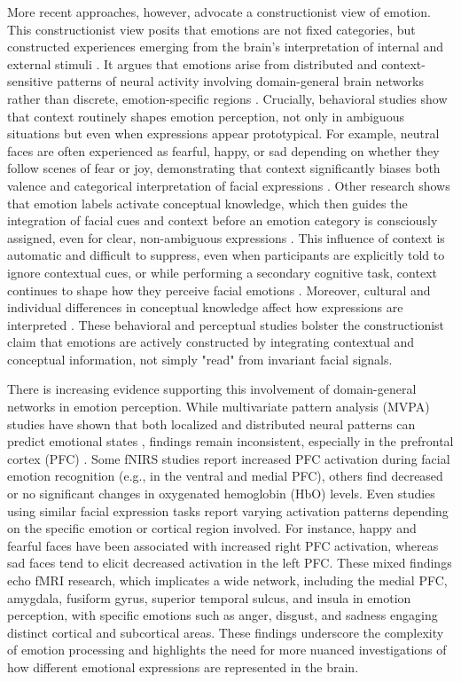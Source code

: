 More recent approaches, however, advocate a constructionist view of emotion. 
This constructionist view posits that emotions are not fixed categories, but constructed experiences emerging from the brain's interpretation of internal and external stimuli \citep{barrett_solving_2006}. 
It argues that emotions arise from distributed and context-sensitive patterns of neural activity involving domain-general brain networks rather than discrete, emotion-specific regions \citep{lindquist_brain_2012}.
Crucially, behavioral studies show that context routinely shapes emotion perception, not only in ambiguous situations but even when expressions appear prototypical. 
For example, neutral faces are often experienced as fearful, happy, or sad depending on whether they follow scenes of fear or joy, demonstrating that context significantly biases both valence and categorical interpretation of facial expressions \citep{calbi_how_2017}. 
Other research shows that emotion labels activate conceptual knowledge, which then guides the integration of facial cues and context before an emotion category is consciously assigned, even for clear, non-ambiguous expressions \citep{brooks_conceptual_2018}.
This influence of context is automatic and difficult to suppress, even when participants are explicitly told to ignore contextual cues, or while performing a secondary cognitive task, context continues to shape how they perceive facial emotions \citep{aviezer_automaticity_2011}. 
Moreover, cultural and individual differences in conceptual knowledge affect how expressions are interpreted \citep{lee_context_2012}. 
These behavioral and perceptual studies bolster the constructionist claim that emotions are actively constructed by integrating contextual and conceptual information, not simply "read" from invariant facial signals. 

There is increasing evidence supporting this involvement of domain-general networks in emotion perception. 
While multivariate pattern analysis (MVPA) studies have shown that both localized and distributed neural patterns can predict emotional states \citep{kragel_decoding_2016}, findings remain inconsistent, especially in the prefrontal cortex (PFC) \citep{westgarth_systematic_2021, bendall_brief_2016}.
Some fNIRS studies report increased PFC activation during facial emotion recognition (e.g., in the ventral and medial PFC), others find decreased or no significant changes in oxygenated hemoglobin (HbO) levels.
Even studies using similar facial expression tasks report varying activation patterns depending on the specific emotion or cortical region involved. 
For instance, happy and fearful faces have been associated with increased right PFC activation, whereas sad faces tend to elicit decreased activation in the left PFC. 
These mixed findings echo fMRI research, which implicates a wide network, including the medial PFC, amygdala, fusiform gyrus, superior temporal sulcus, and insula in emotion perception, with specific emotions such as anger, disgust, and sadness engaging distinct cortical and subcortical areas. 
These findings underscore the complexity of emotion processing and highlights the need for more nuanced investigations of how different emotional expressions are represented in the brain.

